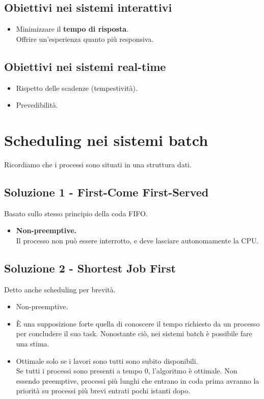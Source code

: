 \documentclass{report}
\begin{document}
\subsection{Obiettivi nei sistemi interattivi}
\begin{itemize}
    \item Minimizzare il \textbf{tempo di risposta}.\\
    Offrire un'esperienza quanto più responsiva.
\end{itemize}

\subsection{Obiettivi nei sistemi real-time}
\begin{itemize}
    \item Rispetto delle scadenze (tempestività).
    \item Prevedibilità.
\end{itemize}


\section{Scheduling nei sistemi batch}
Ricordiamo che i processi sono situati in una struttura dati.
\subsection{Soluzione 1 - First-Come First-Served}
Basato sullo stesso principio della coda FIFO.
\begin{itemize}
    \item \textbf{Non-preemptive.}\\
    Il processo non può essere interrotto, e deve lasciare autonomamente la CPU.
\end{itemize}

\subsection{Soluzione 2 - Shortest Job First}
Detto anche scheduling per brevità.
\begin{itemize}
    \item Non-preemptive.
    \item È una supposizione forte quella di conoscere il tempo richiesto da un processo per concludere il suo task. Nonostante ciò, nei sistemi batch è possibile fare una stima.
    \item Ottimale solo se i lavori sono tutti sono subito disponibili.\\
    Se tutti i processi sono presenti a tempo 0, l'algoritmo è ottimale. Non essendo preemptive, processi più lunghi che entrano in coda prima avranno la priorità su processi più brevi entrati pochi istanti dopo.
\end{itemize}
\end{document}
